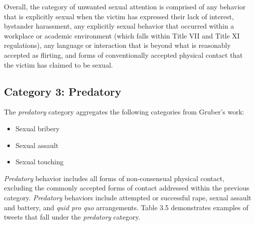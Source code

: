 Overall, the category of unwanted sexual attention is comprised of any behavior that is explicitly sexual when the victim has expressed their lack of interest, bystander harassment, any explicitly sexual behavior that occurred within a workplace or academic environment (which falls within Title VII and Title XI regulations), any language or interaction that is beyond what is reasonably accepted as flirting, and forms of conventionally accepted physical contact that the victim has claimed to be sexual.

\subsection{Category 3: Predatory}

The  \textit{predatory} category aggregates the following categories from Gruber's work:

\begin{itemize}
    \item Sexual bribery
    \item Sexual assault
    \item Sexual touching
\end{itemize}

 \textit{Predatory} behavior includes all forms of non-consensual physical contact, excluding the commonly accepted forms of contact addressed within the previous category.  \textit{Predatory} behaviors include attempted or successful rape, sexual assault and battery, and \textit{quid pro quo} arrangements. Table 3.5 demonstrates examples of tweets that fall under the \textit{predatory} category.

